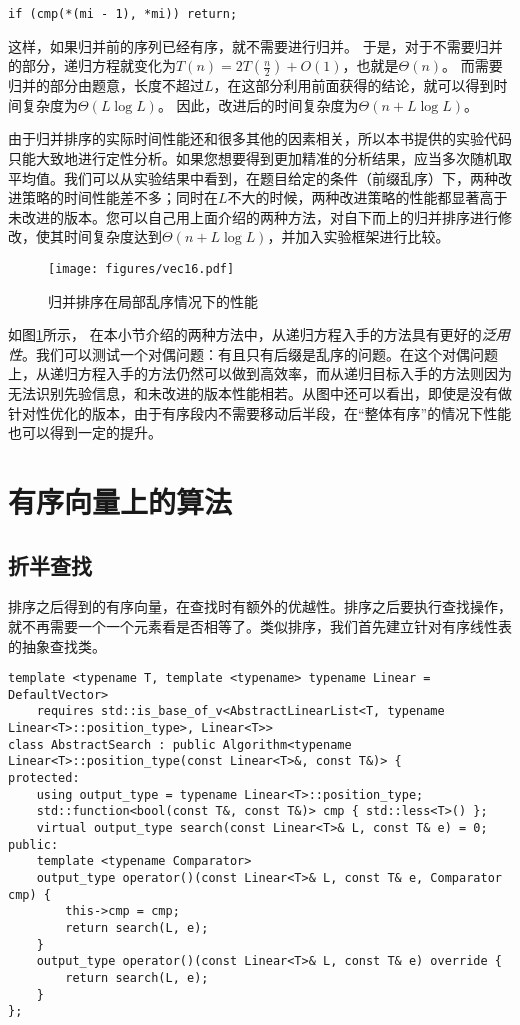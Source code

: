 \begin{lstlisting}
if (cmp(*(mi - 1), *mi)) return;
\end{lstlisting}

这样，如果归并前的序列已经有序，就不需要进行归并。
于是，对于不需要归并的部分，递归方程就变化为$T(n) = 2T\left(\frac n2\right) + O(1)$，也就是$\Theta(n)$。
而需要归并的部分由题意，长度不超过$L$，在这部分利用前面获得的结论，就可以得到时间复杂度为$\Theta(L\log L)$。
因此，改进后的时间复杂度为$\Theta(n+L\log L)$。

由于归并排序的实际时间性能还和很多其他的因素相关，所以本书提供的实验代码只能大致地进行定性分析。如果您想要得到更加精准的分析结果，应当多次随机取平均值。我们可以从实验结果中看到，在题目给定的条件（前缀乱序）下，两种改进策略的时间性能差不多；同时在$L$不大的时候，两种改进策略的性能都显著高于未改进的版本。您可以自己用上面介绍的两种方法，对自下而上的归并排序进行修改，使其时间复杂度达到$\Theta(n+L\log L)$，并加入实验框架进行比较。

\begin{figure}
  \centering
  \texttt{[image: figures/vec16.pdf]}
  \caption{归并排序在局部乱序情况下的性能}
  \label{fig:vec16}
\end{figure}

如图\ref{fig:vec16}所示，
在本小节介绍的两种方法中，从递归方程入手的方法具有更好的\textit{泛用性}。我们可以测试一个对偶问题：有且只有后缀是乱序的问题。在这个对偶问题上，从递归方程入手的方法仍然可以做到高效率，而从递归目标入手的方法则因为无法识别先验信息，和未改进的版本性能相若。从图中还可以看出，即使是没有做针对性优化的版本，由于有序段内不需要移动后半段，在“整体有序”的情况下性能也可以得到一定的提升。

\section{有序向量上的算法}

\subsection{折半查找}
排序之后得到的有序向量，在查找时有额外的优越性。排序之后要执行查找操作，就不再需要一个一个元素看是否相等了。类似排序，我们首先建立针对有序线性表的抽象查找类。

\begin{lstlisting}
template <typename T, template <typename> typename Linear = DefaultVector>
    requires std::is_base_of_v<AbstractLinearList<T, typename Linear<T>::position_type>, Linear<T>>
class AbstractSearch : public Algorithm<typename Linear<T>::position_type(const Linear<T>&, const T&)> {
protected:
    using output_type = typename Linear<T>::position_type;
    std::function<bool(const T&, const T&)> cmp { std::less<T>() };
    virtual output_type search(const Linear<T>& L, const T& e) = 0;
public:
    template <typename Comparator>
    output_type operator()(const Linear<T>& L, const T& e, Comparator cmp) {
        this->cmp = cmp;
        return search(L, e);
    }
    output_type operator()(const Linear<T>& L, const T& e) override {
        return search(L, e);
    }
};
\end{lstlisting}

